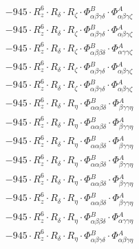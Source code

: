 \documentclass{article}
\begin{document}
\begin{subequations}
\begin{gather}
\begin{array}{c}
 \\[0.2em] 		 - 945 \cdot R_{z}^{6} \cdot R_{\delta{}} \cdot R_{\zeta{}} \cdot \Phi{}^{B}_{\alpha{}\beta{}\gamma{}\delta{}} \cdot \Phi{}^{A}_{\alpha{}\beta{}\gamma{}\zeta{}} 
 \\[0.2em] 		 - 945 \cdot R_{z}^{6} \cdot R_{\delta{}} \cdot R_{\zeta{}} \cdot \Phi{}^{B}_{\alpha{}\beta{}\gamma{}\delta{}} \cdot \Phi{}^{A}_{\alpha{}\beta{}\gamma{}\zeta{}} 
 \\[0.2em] 		 - 945 \cdot R_{z}^{6} \cdot R_{\delta{}} \cdot R_{\zeta{}} \cdot \Phi{}^{B}_{\alpha{}\beta{}\beta{}\delta{}} \cdot \Phi{}^{A}_{\alpha{}\gamma{}\gamma{}\zeta{}} 
 \\[0.2em] 		 - 945 \cdot R_{z}^{6} \cdot R_{\delta{}} \cdot R_{\zeta{}} \cdot \Phi{}^{B}_{\alpha{}\beta{}\gamma{}\delta{}} \cdot \Phi{}^{A}_{\alpha{}\beta{}\gamma{}\zeta{}} 
 \\[0.2em] 		 - 945 \cdot R_{z}^{6} \cdot R_{\delta{}} \cdot R_{\zeta{}} \cdot \Phi{}^{B}_{\alpha{}\beta{}\gamma{}\delta{}} \cdot \Phi{}^{A}_{\alpha{}\beta{}\gamma{}\zeta{}} 
 \\[0.2em] 		 - 945 \cdot R_{z}^{6} \cdot R_{\delta{}} \cdot R_{\eta{}} \cdot \Phi{}^{B}_{\alpha{}\alpha{}\beta{}\delta{}} \cdot \Phi{}^{A}_{\beta{}\gamma{}\gamma{}\eta{}} 
 \\[0.2em] 		 - 945 \cdot R_{z}^{6} \cdot R_{\delta{}} \cdot R_{\eta{}} \cdot \Phi{}^{B}_{\alpha{}\alpha{}\beta{}\delta{}} \cdot \Phi{}^{A}_{\beta{}\gamma{}\gamma{}\eta{}} 
 \\[0.2em] 		 - 945 \cdot R_{z}^{6} \cdot R_{\delta{}} \cdot R_{\eta{}} \cdot \Phi{}^{B}_{\alpha{}\alpha{}\beta{}\delta{}} \cdot \Phi{}^{A}_{\beta{}\gamma{}\gamma{}\eta{}} 
 \\[0.2em] 		 - 945 \cdot R_{z}^{6} \cdot R_{\delta{}} \cdot R_{\eta{}} \cdot \Phi{}^{B}_{\alpha{}\alpha{}\beta{}\delta{}} \cdot \Phi{}^{A}_{\beta{}\gamma{}\gamma{}\eta{}} 
 \\[0.2em] 		 - 945 \cdot R_{z}^{6} \cdot R_{\delta{}} \cdot R_{\eta{}} \cdot \Phi{}^{B}_{\alpha{}\alpha{}\beta{}\delta{}} \cdot \Phi{}^{A}_{\beta{}\gamma{}\gamma{}\eta{}} 
 \\[0.2em] 		 - 945 \cdot R_{z}^{6} \cdot R_{\delta{}} \cdot R_{\eta{}} \cdot \Phi{}^{B}_{\alpha{}\alpha{}\beta{}\delta{}} \cdot \Phi{}^{A}_{\beta{}\gamma{}\gamma{}\eta{}} 
 \\[0.2em] 		 - 945 \cdot R_{z}^{6} \cdot R_{\delta{}} \cdot R_{\eta{}} \cdot \Phi{}^{B}_{\alpha{}\beta{}\beta{}\delta{}} \cdot \Phi{}^{A}_{\alpha{}\gamma{}\gamma{}\eta{}} 
 \\[0.2em] 		 - 945 \cdot R_{z}^{6} \cdot R_{\delta{}} \cdot R_{\eta{}} \cdot \Phi{}^{B}_{\alpha{}\beta{}\gamma{}\delta{}} \cdot \Phi{}^{A}_{\alpha{}\beta{}\gamma{}\eta{}} 

\end{array}
\end{gather}
\end{subequations}
\end{document}
